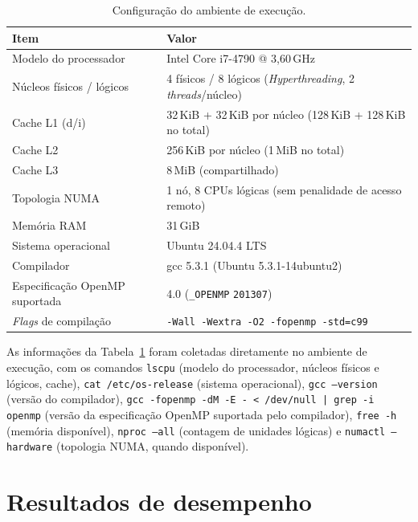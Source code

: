 \documentclass[11pt,a4paper]{article}
\begin{document}
\begin{table}[H]
\centering
\small %
\begin{tabular}{@{}ll@{}}
\toprule
Item & Valor \\
\midrule
Modelo do processador          & Intel\textregistered{} Core\texttrademark{} i7-4790 @ 3{,}60\,GHz \\
Núcleos físicos / lógicos      & 4 físicos / 8 lógicos (\emph{Hyperthreading}, 2 \emph{threads}/núcleo) \\
Cache L1 (d/i)                 & 32\,KiB + 32\,KiB por núcleo (128\,KiB + 128\,KiB no total) \\
Cache L2                       & 256\,KiB por núcleo (1\,MiB no total) \\
Cache L3                       & 8\,MiB (compartilhado) \\
Topologia NUMA                 & 1 nó, 8 CPUs lógicas (sem penalidade de acesso remoto) \\
Memória RAM                    & 31\,GiB \\
Sistema operacional            & Ubuntu 24.04.4 LTS \\
Compilador                     & gcc 5.3.1 (Ubuntu 5.3.1-14ubuntu2) \\
Especificação OpenMP suportada & 4.0 (\texttt{\_OPENMP} \texttt{201307}) \\
\emph{Flags} de compilação     & \texttt{-Wall -Wextra -O2 -fopenmp -std=c99} \\
\bottomrule
\end{tabular}
\caption{Configuração do ambiente de execução.}
\label{tab:ambiente}
\end{table}

As informações da Tabela~\ref{tab:ambiente} foram coletadas diretamente no ambiente de execução, com os comandos \texttt{lscpu} (modelo do processador, núcleos físicos e lógicos, cache), \texttt{cat /etc/os-release} (sistema operacional), \texttt{gcc --version} (versão do compilador), \texttt{gcc -fopenmp -dM -E - < /dev/null | grep -i openmp} (versão da especificação OpenMP suportada pelo compilador), \texttt{free -h} (memória disponível), \texttt{nproc --all} (contagem de unidades lógicas) e \texttt{numactl --hardware} (topologia NUMA, quando disponível).

\section{Resultados de desempenho}
\label{sec:resultados}
\end{document}
